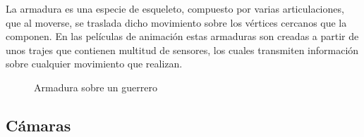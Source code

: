 \label{sec:armadura}
La armadura es una especie de esqueleto, compuesto por varias articulaciones, que al moverse, se traslada dicho movimiento sobre los vértices cercanos que la componen. En las películas de animación estas armaduras son creadas a partir de unos trajes que contienen multitud de sensores, los cuales transmiten información sobre cualquier movimiento que realizan.
\begin{figure}[h]
	\centering	  
	\caption{Armadura sobre un guerrero}
\end{figure}




\subsection{Cámaras}


